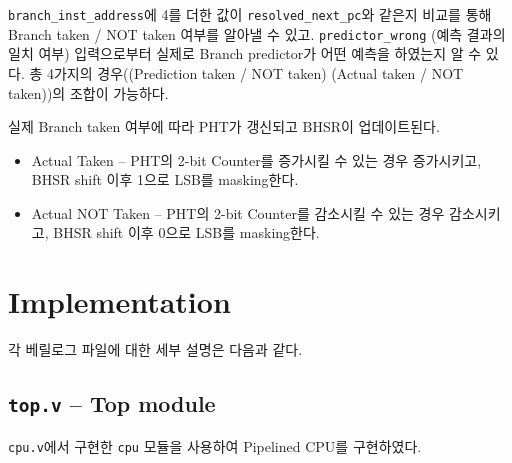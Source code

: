 \documentclass{scrartcl}
\begin{document}
\texttt{branch\_inst\_address}에 4를 더한 값이 \texttt{resolved\_next\_pc}와 같은지 비교를 통해 Branch taken / NOT taken 여부를 알아낼 수 있고.
\texttt{predictor\_wrong} (예측 결과의 일치 여부) 입력으로부터 실제로 Branch predictor가 어떤 예측을 하였는지 알 수 있다. 총 4가지의 경우((Prediction taken / NOT taken) \times (Actual taken / NOT taken))의 조합이 가능하다.

실제 Branch taken 여부에 따라 PHT가 갱신되고 BHSR이 업데이트된다.
\begin{itemize}
  \item Actual Taken -- PHT의 2-bit Counter를 증가시킬 수 있는 경우 증가시키고, BHSR shift 이후 1으로 LSB를 masking한다.
  \item Actual NOT Taken -- PHT의 2-bit Counter를 감소시킬 수 있는 경우 감소시키고, BHSR shift 이후 0으로 LSB를 masking한다.
\end{itemize}

\section{Implementation}
각 베릴로그 파일에 대한 세부 설명은 다음과 같다.

\subsection{\texttt{top.v} -- Top module}
\texttt{cpu.v}에서 구현한 \texttt{cpu} 모듈을 사용하여 Pipelined CPU를 구현하였다.
\end{document}
